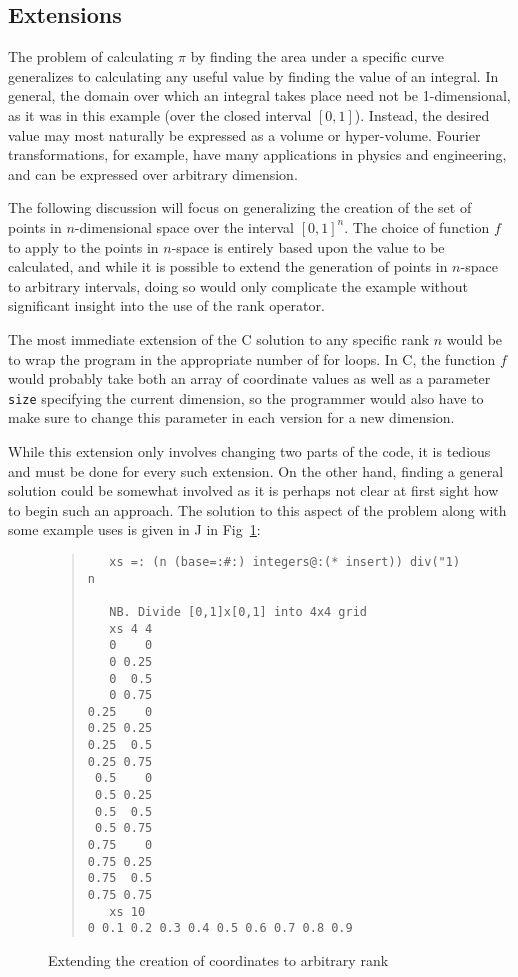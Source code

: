 \subsection{Extensions}
\label{piext}
The problem of calculating $\pi$ by finding the area under a specific curve 
generalizes to calculating any useful value by finding the value of an integral. 
In general, the domain over which an integral takes place need not be 1-dimensional, 
as it was in this example (over the closed interval $[0,1]$).
Instead, the desired value may most naturally be expressed as a volume or hyper-volume. 
Fourier transformations, for example, have many applications in physics and engineering, 
and can be expressed over arbitrary dimension.

The following discussion will focus on generalizing the creation of 
the set of points in $n$-dimensional space over the interval $[0,1]^n$.
The choice of function $f$ to apply to the points in $n$-space 
is entirely based upon the value to be calculated, 
and while it is possible to extend the generation of points in $n$-space 
to arbitrary intervals, doing so would only complicate the example 
without significant insight into the use of the rank operator.

The most immediate extension of the C solution to any specific rank $n$ %
would be to wrap the program in the appropriate number of for loops. 
In C, the function $f$ would probably take both 
an array of coordinate values as well as a parameter \texttt{size} specifying the current dimension, 
so the programmer would also have to make sure to change this parameter in each version for a new dimension.

While this extension only involves changing two parts of the code, it is tedious 
and must be done for every such extension. 
On the other hand, finding a general solution could be somewhat involved 
as it is perhaps not clear at first sight how to begin such an approach.
The solution to this aspect of the problem along with some example uses is given in J in Fig~\ref{fig::xs_ext}:

\begin{figure}
\begin{quote}
\begin{singlespacing}
\begin{small}
\begin{verbatim}
   xs =: (n (base=:#:) integers@:(* insert)) div("1) n

   NB. Divide [0,1]x[0,1] into 4x4 grid
   xs 4 4
   0    0
   0 0.25
   0  0.5
   0 0.75
0.25    0
0.25 0.25
0.25  0.5
0.25 0.75
 0.5    0
 0.5 0.25
 0.5  0.5
 0.5 0.75
0.75    0
0.75 0.25
0.75  0.5
0.75 0.75
   xs 10
0 0.1 0.2 0.3 0.4 0.5 0.6 0.7 0.8 0.9
\end{verbatim}
\end{small}
\end{singlespacing}
\end{quote}
\caption{Extending the creation of coordinates to arbitrary rank}
\label{fig::xs_ext}
\end{figure}


